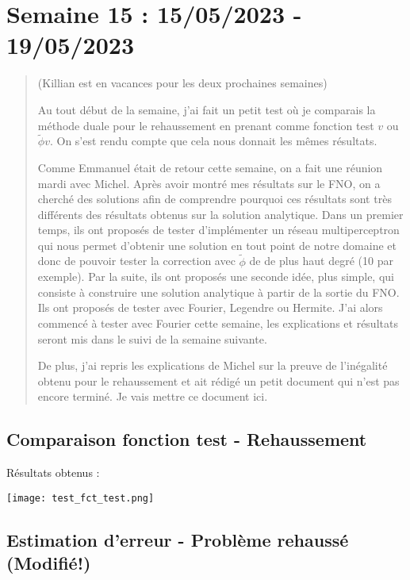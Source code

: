 \section{Semaine 15 : 15/05/2023 - 19/05/2023}
\graphicspath{{semaines/semaine_15/images/}}

\setcounter{equation}{0}

\begin{abstract}
	(Killian est en vacances pour les deux prochaines semaines)
	
	Au tout début de la semaine, j'ai fait un petit test où je comparais la méthode duale pour le rehaussement en prenant comme fonction test $v$ ou $\tilde{\phi}v$. On s'est rendu compte que cela nous donnait les mêmes résultats.
	
	Comme Emmanuel était de retour cette semaine, on a fait une réunion mardi avec Michel. Après avoir montré mes résultats sur le FNO, on a cherché des solutions afin de comprendre pourquoi ces résultats sont très différents des résultats obtenus sur la solution analytique. Dans un premier temps, ils ont proposés de tester d'implémenter un réseau multiperceptron qui nous permet d'obtenir une solution en tout point de notre domaine et donc de pouvoir tester la correction avec $\tilde{\phi}$ de de plus haut degré (10 par exemple). Par la suite, ils ont proposés une seconde idée, plus simple, qui consiste à construire une solution analytique à partir de la sortie du FNO. Ils ont proposés de tester avec Fourier, Legendre ou Hermite. J'ai alors commencé à tester avec Fourier cette semaine, les explications et résultats seront mis dans le suivi de la semaine suivante. 
	
	De plus, j'ai repris les explications de Michel sur la preuve de l'inégalité obtenu pour le rehaussement et ait rédigé un petit document qui n'est pas encore terminé. Je vais mettre ce document ici.  
\end{abstract}

\subsection{Comparaison fonction test - Rehaussement}

Résultats obtenus :

\begin{minipage}{\linewidth}
	\centering
	\texttt{[image: test\_fct\_test.png]}
\end{minipage}

\subsection{Estimation d'erreur - Problème rehaussé (Modifié!) \faBookmarkO}

